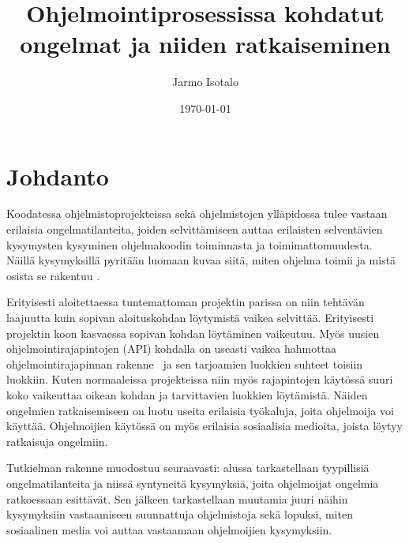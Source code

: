 \documentclass[finnish]{../tktltiki2}
\title{Ohjelmointiprosessissa kohdatut ongelmat ja niiden ratkaiseminen}
\author{Jarmo Isotalo}
\date{\today}
\theoremstyle{definition}
\theoremstyle{remark}
\begin{document}

\frontmatter      %

\maketitle        %
\makeabstract     %

\tableofcontents  %


\mainmatter       %

\section{Johdanto}
Koodatessa ohjelmistoprojekteissa sekä ohjelmistojen ylläpidossa tulee vastaan erilaisia ongelmatilanteita, joiden selvittämiseen auttaa erilaisten selventävien kysymysten kysyminen ohjelmakoodin toiminnasta ja toimimattomuudesta. Näillä kysymyksillä pyritään luomaan kuvaa siitä, miten ohjelma toimii ja mistä osista se rakentuu \cite{g_search_code, questions-during-software-evolution-tasks,asking-and-answering-api-questions}.

Erityisesti aloitettaessa tuntemattoman projektin parissa on niin tehtävän laajuutta kuin sopivan aloituskohdan löytymistä vaikea selvittää. Erityisesti projektin koon kasvaessa sopivan kohdan löytäminen vaikeutuu.
Myös uusien ohjelmointirajapintojen (API) kohdalla on useasti vaikea hahmottaa ohjelmointirajapinnan rakenne~\cite{jungloid-mining} ja sen tarjoamien luokkien suhteet toisiin luokkiin. Kuten normaaleissa projekteissa niin myös rajapintojen käytössä suuri koko vaikeuttaa oikean kohdan ja tarvittavien luokkien löytämistä.
Näiden ongelmien ratkaisemiseen on luotu useita erilaisia työkaluja, joita ohjelmoija voi käyttää. Ohjelmoijien käytössä on myös erilaisia sosiaalisia medioita, joista löytyy ratkaisuja ongelmiin.

Tutkielman rakenne muodostuu seuraavasti: alussa tarkastellaan tyypillisiä ongelmatilanteita ja niissä syntyneitä kysymyksiä, joita ohjelmoijat ongelmia ratkoessaan esittävät. Sen jälkeen tarkastellaan muutamia juuri näihin kysymyksiin vastaamiseen suunnattuja ohjelmistoja sekä lopuksi, miten sosiaalinen media voi auttaa vastaamaan ohjelmoijien kysymyksiin.
\end{document}
